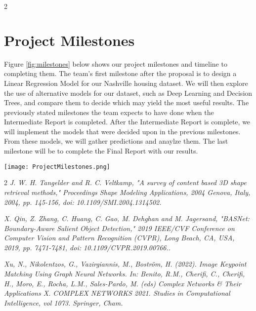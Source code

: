 \documentclass[letter,10pt]{article}
\begin{document}
\begin{multicols}{2}
		
  
        \section{Project Milestones}
		Figure \ref{fig:milestones} below shows our project milestones and timeline to completing them. The team's first milestone after the proposal is to design a Linear Regression Model for our Nashville housing dataset. We will then explore the use of alternative models for our dataset, such as Deep Learning and Decision Trees, and compare them to decide which may yield the most useful results. The previously stated milestones the team expects to have done when the Intermediate Report is completed. After the Intermediate Report is complete, we will implement the models that were decided upon in the previous milestones. From these models, we will gather predictions and anaylze them. The last milestone will be to complete the Final Report with our results. 
		\par

\begin{figure*}[t]
    \centering
    \texttt{[image: ProjectMilestones.png]}
    \caption{Milestones and Expected Completion Dates.}
    \label{fig:milestones}
\end{figure*}

		\begin{thebibliography}{2}
			\textit{J. W. H. Tangelder and R. C. Veltkamp, "A survey of content based 3D shape retrieval methods," Proceedings Shape Modeling Applications, 2004 Genova, Italy, 2004, pp. 145-156, doi: 10.1109/SMI.2004.1314502.}

			\textit{X. Qin, Z. Zhang, C. Huang, C. Gao, M. Dehghan and M. Jagersand, "BASNet: Boundary-Aware Salient Object Detection," 2019 IEEE/CVF Conference on     Computer Vision and Pattern Recognition (CVPR), Long Beach, CA, USA, 2019, pp. 7471-7481, doi: 10.1109/CVPR.2019.00766..}

                \textit{Xu, N., Nikolentzos, G., Vazirgiannis, M., Boström, H. (2022). Image Keypoint Matching Using Graph Neural Networks. In: Benito, R.M., Cherifi, C., Cherifi, H., Moro, E., Rocha, L.M., Sales-Pardo, M. (eds) Complex Networks & Their Applications X. COMPLEX NETWORKS 2021. Studies in Computational Intelligence, vol 1073. Springer, Cham.}


		\end{thebibliography}
	\end{multicols}
\end{document}
